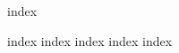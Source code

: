 \documentclass[
    a5paper, %
    openright, %
    twoside, %
    english, %
    brazil, %
    chapter=TITLE,
    section=TITLE,
]{abntex2}
\begin{document}
\sffamily

\pretextual

{index}

\textual

{index}
{index}
{index}
{index}
{index}

\printbibliography

\end{document}
